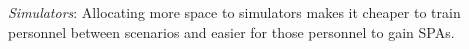 \emph{Simulators}: Allocating more space to simulators makes it cheaper to train personnel between scenarios and easier for those personnel to gain SPAs.
